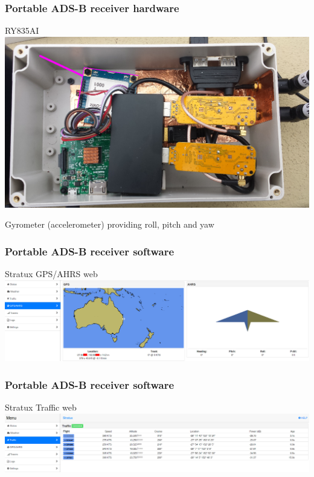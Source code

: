 \begin{frame}
\frametitle{Portable ADS-B receiver hardware}
\begin{block}{RY835AI}
\includegraphics[height=0.5\textheight]{image/adsb-hardware-ry835ai.png}

Gyrometer (accelerometer) providing roll, pitch and yaw
\end{block}
\end{frame}

\begin{frame}
\frametitle{Portable ADS-B receiver software}
\begin{block}{Stratux GPS/AHRS web}
\includegraphics[height=0.32\textheight]{image/stratux-gps-ahrs-web.png}
\end{block}
\end{frame}

\begin{frame}
\frametitle{Portable ADS-B receiver software}
\begin{block}{Stratux Traffic web}
\includegraphics[height=0.23\textheight]{image/stratux-traffic-web.png}
\end{block}
\end{frame}

